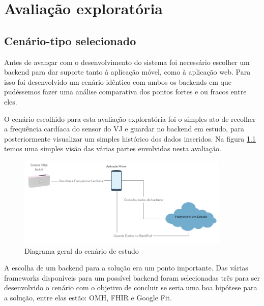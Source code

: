 \chapter{Avaliação exploratória}

\section{Cenário-tipo selecionado}

Antes de avançar com o desenvolvimento do sistema foi necessário escolher um backend para dar suporte tanto à aplicação móvel, como à aplicação web. Para isso foi desenvolvido um cenário idêntico com ambos os backends em que pudéssemos fazer uma análise comparativa dos pontos fortes e ou fracos entre eles. \par 
O cenário escolhido para esta avaliação exploratória foi o simples ato de recolher a frequência cardíaca do sensor do \gls{VJ} e guardar no backend em estudo, para posteriormente visualizar um simples histórico dos dados inseridos. Na figura \ref{f:study-overview} temos uma simples visão das várias partes envolvidas nesta avaliação.

\begin{figure}[H]
  \centering
  \includegraphics[width=0.9\textwidth]{imgs/study-overview.png}
  \caption[Diagrama geral do cenário de estudo]{Diagrama geral do cenário de estudo}
  
  \label{f:study-overview}
\end{figure}

A escolha de um backend para a solução era um ponto importante. Das várias frameworks disponíveis para um possível backend foram selecionadas três para ser desenvolvido o cenário com o objetivo de concluir se seria uma boa hipótese para a solução, entre elas estão: \gls{OMH}, \gls{FHIR} e Google Fit. \par

